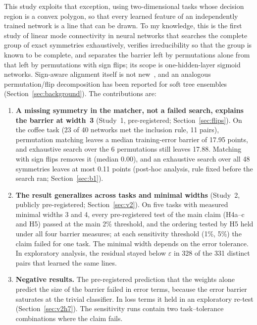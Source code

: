 \documentclass[11pt]{article}
\newcommand{\eps}{\varepsilon}
\begin{document}
This study exploits that exception, using two-dimensional tasks whose decision region is a convex polygon, so that every learned feature of an independently trained network is a line that can be drawn. To my knowledge, this is the first study of linear mode connectivity in neural networks that searches the complete group of exact symmetries exhaustively, verifies irreducibility so that the group is known to be complete, and separates the barrier left by permutations alone from that left by permutations with sign flips; its scope is one-hidden-layer sigmoid networks. Sign-aware alignment itself is not new~\cite{pittorino2022deep,boufalis2025symmetry}, and an analogous permutation/flip decomposition has been reported for soft tree ensembles~\cite{kanoh2025linear} (Section~\ref{sec:background}). The contributions are:

\begin{enumerate}[leftmargin=*]
\item \textbf{A missing symmetry in the matcher, not a failed search, explains the barrier at width~3} (Study~1, pre-registered; Section~\ref{sec:flips}). On the coffee task (23 of 40 networks met the inclusion rule, 11 pairs), permutation matching leaves a median training-error barrier of 17.95 points, and exhaustive search over the 6 permutations still leaves 17.88. Matching with sign flips removes it (median 0.00), and an exhaustive search over all 48 symmetries leaves at most 0.11 points (post-hoc analysis, rule fixed before the search ran; Section~\ref{sec:b1}).
\item \textbf{The result generalizes across tasks and minimal widths} (Study~2, publicly pre-registered; Section~\ref{sec:v2}). On five tasks with measured minimal widths 3 and 4, every pre-registered test of the main claim (H4a--c and H5) passed at the main 2\% threshold, and the ordering tested by H5 held under all four barrier measures; at each sensitivity threshold (1\%, 5\%) the claim failed for one task. The minimal width depends on the error tolerance. In exploratory analysis, the residual stayed below $\eps$ in 328 of the 331 distinct pairs that learned the same lines.
\item \textbf{Negative results.} The pre-registered prediction that the weights alone predict the size of the barrier failed in error terms, because the error barrier saturates at the trivial classifier. In loss terms it held in an exploratory re-test (Section~\ref{sec:v2h7}). The sensitivity runs contain two task--tolerance combinations where the claim fails.
\end{enumerate}
\end{document}
